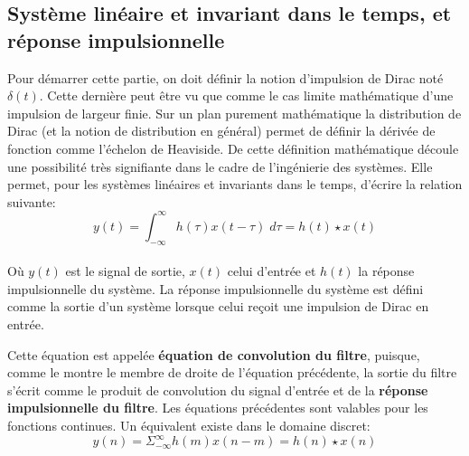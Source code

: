\documentclass[11pt,a4paper]{article}
\begin{document}
\subsection{Système linéaire et invariant dans le temps, et réponse impulsionnelle}
Pour démarrer cette partie, on doit définir la notion d'impulsion de Dirac noté $\delta(t)$. Cette dernière peut être vu que comme le cas limite mathématique d'une impulsion de largeur finie. Sur un plan purement mathématique la distribution de Dirac (et la notion de distribution en général) permet de définir la dérivée de fonction comme l'échelon de Heaviside.  De cette définition mathématique découle une possibilité très signifiante dans le cadre de l'ingénierie des systèmes. Elle permet, pour les systèmes linéaires  et invariants dans le temps, d'écrire la relation suivante:\\  
 
\[y(t) = \int^{\infty}_{-\infty} h(\tau) x(t-\tau) \; d\tau = h(t) \star x(t)\] \\

Où $y(t)$ est le signal de sortie, $x(t)$ celui d'entrée et $h(t)$ la réponse impulsionnelle du système. La réponse impulsionnelle du système est défini comme la sortie d'un système lorsque celui reçoit une impulsion de Dirac en entrée.

\begin{center}
\end{center}

Cette équation est appelée \textbf{équation de convolution du filtre}, puisque, comme le montre le membre de droite de l'équation précédente, la sortie du filtre s'écrit comme le produit de convolution du signal d'entrée et de la \textbf{réponse impulsionnelle du filtre}. Les équations précédentes sont valables pour les fonctions continues. Un équivalent existe dans le domaine discret: \\

\[y(n) = \Sigma^{\infty}_{-\infty} h(m) x(n-m) = h(n) \star x(n)\]\\
\end{document}
